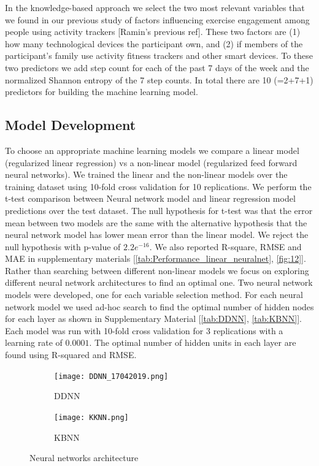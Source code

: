 \documentclass[preprint,12pt]{elsarticle}
\begin{document}
In the knowledge-based approach we select the two most relevant variables that we found in our previous study of factors influencing exercise engagement among people using activity trackers [Ramin's previous ref]. These two factors are (1) how many technological devices the participant own, and (2) if members of the participant’s family use activity fitness trackers and other smart devices. To these two predictors we add step count for each of the past 7 days of the week and the normalized Shannon entropy  of the 7 step counts. In total there are 10 (=2+7+1) predictors for building the machine learning model.

\subsection{Model Development}
To choose an appropriate machine learning models we compare a linear model (regularized linear regression) vs a non-linear model (regularized feed forward neural networks). We trained the linear and the non-linear models over the training dataset using 10-fold cross validation for 10 replications. We perform the t-test comparison between Neural network model and linear regression model predictions over the test dataset. The null hypothesis for t-test was that the error mean between two models are the same with the alternative hypothesis that the neural network model has lower mean error than the linear model. We reject the null hypothesis with p-value of $2.2 {e^{-16}}$. We also reported R-square, RMSE and MAE in supplementary materials [\ref{tab:Performance_linear_neuralnet}, \ref{fig:12}]. Rather than searching between different non-linear models we focus on exploring different neural network architectures to find an optimal one. Two neural network models were developed, one for each variable selection method. For each neural network model we used ad-hoc search to find the optimal number of hidden nodes for each layer as shown in Supplementary Material [\ref{tab:DDNN}, \ref{tab:KBNN}]. Each model was run with 10-fold cross validation for 3 replications with a learning rate of $0.0001$. The optimal number of hidden units in each layer are found using R-squared and RMSE.

\begin{figure}[t]
\centering
   \begin{subfigure}{0.48\linewidth} \centering
     \texttt{[image: DDNN\_17042019.png]}
     \vspace*{-20mm}
     \caption{DDNN}\label{fig:figA}
   \end{subfigure}
   \begin{subfigure}{0.48\linewidth} \centering
     \texttt{[image: KKNN.png]}
     \vspace*{-20mm}
     \caption{KBNN}\label{fig:figB}
   \end{subfigure}
\caption{Neural networks architecture} \label{fig:twofigs}
\label{fig:7}
\end{figure}
\end{document}
